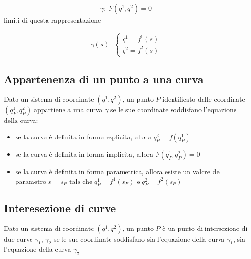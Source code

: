 \documentclass[letterpaper,10pt,italian]{jupyterBook}
\begin{document}
\sphinxAtStartPar
{}
\begin{equation*}
\begin{split}\gamma: \ F(q^1, q^2) = 0\end{split}
\end{equation*}
\sphinxAtStartPar
{} limiti di questa rappresentazione

\sphinxAtStartPar
{}
\begin{equation*}
\begin{split}\gamma(s): \ \begin{cases} q^1 = f^1(s) \\ q^2 = f^2(s) \end{cases}\end{split}
\end{equation*}
\sphinxAtStartPar
{} 


\subsection{Appartenenza di un punto a una curva}
\label{\detokenize{ch/analytic_geometry/analytic_geometry_2d/curves:appartenenza-di-un-punto-a-una-curva}}
\sphinxAtStartPar
Dato un sistema di coordinate \((q^1, q^2)\), un punto \(P\) identificato dalle coordinate \((q^1_P, q^2_P)\) appartiene a una curva \(\gamma\) se le sue coordinate soddisfano l’equazione della curva:
\begin{itemize}
\item {} 
\sphinxAtStartPar
se la curva è definita in forma esplicita, allora \(q^2_P = f(q^1_P)\)

\item {} 
\sphinxAtStartPar
se la curva è definita in forma implicita, allora \(F(q^1_P, q^2_P)=0\)

\item {} 
\sphinxAtStartPar
se la curva è definita in forma parametrica, allora esiste un valore del parametro \(s=s_P\) tale che \(q^1_P = f^1(s_P)\) e \(q^2_P = f^2(s_P)\)

\end{itemize}


\subsection{Interesezione di curve}
\label{\detokenize{ch/analytic_geometry/analytic_geometry_2d/curves:interesezione-di-curve}}
\sphinxAtStartPar
Dato un sistema di coordinate \((q^1, q^2)\), un punto \(P\) è un punto di intersezione di due curve \(\gamma_1\), \(\gamma_2\) se le sue coordinate soddisfano sia l’equazione della curva \(\gamma_1\), sia l’equazione della curva \(\gamma_2\)
\end{document}
